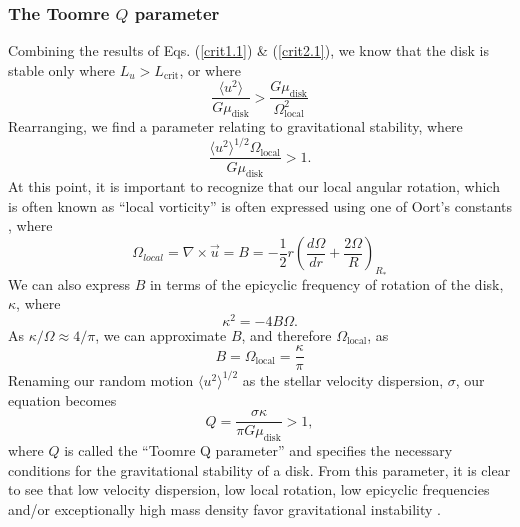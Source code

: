 \documentclass[aps,pra,twocolumn]{revtex4-1}
\begin{document}
\subsubsection{\label{section 3.1.3} The Toomre $Q$ parameter}
Combining the results of Eqs. (\ref{crit1.1}) \& (\ref{crit2.1}), we know that the disk is stable only where $L_u > L_\text{crit}$, or where
\begin{equation}
\frac{\langle u^2 \rangle}{G\mu_\text{disk}} > \frac{G \mu_\text{disk}}{\Omega_\text{local}^2} \nonumber
\end{equation}
Rearranging, we find a parameter relating to gravitational stability, where \cite{whittle2010}
\begin{equation}
\frac{\langle u^2 \rangle^{1/2} \Omega_\text{local}}{G\mu_\text{disk}} > 1.
\end{equation}
At this point, it is important to recognize that our local angular rotation, which is often known as ``local vorticity'' is often expressed using one of Oort's constants \cite{whittle2010}, where
\begin{equation}
\Omega_{local} = \nabla \times \vec{u} = B = -\frac{1}{2}r\left(\frac{d\Omega}{dr} + \frac{2\Omega}{R}  \right)_{R_*}
\end{equation}
We can also express $B$ in terms of the epicyclic frequency of rotation of the disk, $\kappa$, where \cite{whittle2010}
\begin{equation}
\kappa^2 = -4B\Omega.
\end{equation}
As $\kappa/\Omega \approx 4/\pi$, we can approximate $B$, and therefore $\Omega_\text{local}$, as
\begin{equation}
B = \Omega_\text{local} = \frac{\kappa}{\pi}
\end{equation}
Renaming our random motion $\langle u^2 \rangle ^{1/2}$ as the stellar velocity dispersion, $\sigma$, our equation becomes
\begin{equation}
Q = \frac{\sigma \kappa}{\pi G\mu_\text{disk}} > 1,
\end{equation}
where $Q$ is called the ``Toomre Q parameter'' and specifies the necessary conditions for the gravitational stability of a disk.  From this parameter, it is clear to see that low velocity dispersion, low local rotation, low epicyclic frequencies and/or exceptionally high mass density favor gravitational instability \cite{whittle2010}.
\end{document}
